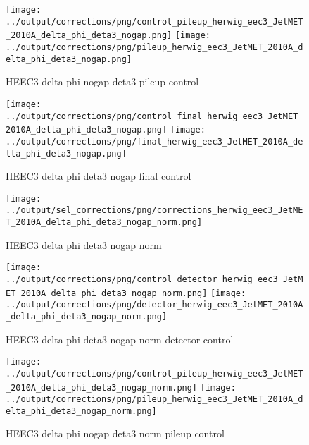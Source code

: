 \documentclass[11pt]{book}
\begin{document}
\begin{figure}[ht]
\centering
\texttt{[image: ../output/corrections/png/control\_pileup\_herwig\_eec3\_JetMET\_2010A\_delta\_phi\_deta3\_nogap.png]}
\texttt{[image: ../output/corrections/png/pileup\_herwig\_eec3\_JetMET\_2010A\_delta\_phi\_deta3\_nogap.png]}
\caption{HEEC3 delta phi nogap deta3 pileup control}
\label{fig:HEEC3_JetMET_2010A_delta_phi_deta3_nogap_pileup_control}
\end{figure}


\begin{figure}[ht]
\centering
\texttt{[image: ../output/corrections/png/control\_final\_herwig\_eec3\_JetMET\_2010A\_delta\_phi\_deta3\_nogap.png]}
\texttt{[image: ../output/corrections/png/final\_herwig\_eec3\_JetMET\_2010A\_delta\_phi\_deta3\_nogap.png]}
\caption{HEEC3 delta phi deta3 nogap final control}
\label{fig:HEEC3_JetMET_2010A_delta_phi_deta3_nogap_final_control}
\end{figure}

\begin{figure}[ht]
\centering
\texttt{[image: ../output/sel\_corrections/png/corrections\_herwig\_eec3\_JetMET\_2010A\_delta\_phi\_deta3\_nogap\_norm.png]}
\caption{HEEC3 delta phi deta3 nogap norm}
\label{fig:HEEC3_JetMET_2010A_delta_phi_deta3_nogap_norm}
\end{figure}

\begin{figure}[ht]
\centering
\texttt{[image: ../output/corrections/png/control\_detector\_herwig\_eec3\_JetMET\_2010A\_delta\_phi\_deta3\_nogap\_norm.png]}
\texttt{[image: ../output/corrections/png/detector\_herwig\_eec3\_JetMET\_2010A\_delta\_phi\_deta3\_nogap\_norm.png]}
\caption{HEEC3 delta phi deta3 nogap norm detector control}
\label{fig:HEEC3_JetMET_2010A_delta_phi_deta3_nogap_norm_detector_control}
\end{figure}

\begin{figure}[ht]
\centering
\texttt{[image: ../output/corrections/png/control\_pileup\_herwig\_eec3\_JetMET\_2010A\_delta\_phi\_deta3\_nogap\_norm.png]}
\texttt{[image: ../output/corrections/png/pileup\_herwig\_eec3\_JetMET\_2010A\_delta\_phi\_deta3\_nogap\_norm.png]}
\caption{HEEC3 delta phi nogap deta3 norm pileup control}
\label{fig:HEEC3_JetMET_2010A_delta_phi_deta3_nogap_norm_pileup_control}
\end{figure}
\end{document}
